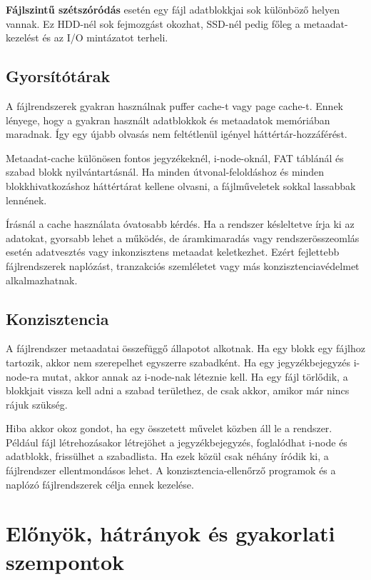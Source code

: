 \textbf{Fájlszintű szétszóródás} esetén egy fájl adatblokkjai sok különböző helyen vannak. Ez HDD-nél sok fejmozgást okozhat, SSD-nél pedig főleg a metaadat-kezelést és az I/O mintázatot terheli.

\subsection{Gyorsítótárak}

A fájlrendszerek gyakran használnak puffer cache-t vagy page cache-t. Ennek lényege, hogy a gyakran használt adatblokkok és metaadatok memóriában maradnak. Így egy újabb olvasás nem feltétlenül igényel háttértár-hozzáférést.

Metaadat-cache különösen fontos jegyzékeknél, i-node-oknál, FAT táblánál és szabad blokk nyilvántartásnál. Ha minden útvonal-feloldáshoz és minden blokkhivatkozáshoz háttértárat kellene olvasni, a fájlműveletek sokkal lassabbak lennének.

Írásnál a cache használata óvatosabb kérdés. Ha a rendszer késleltetve írja ki az adatokat, gyorsabb lehet a működés, de áramkimaradás vagy rendszerösszeomlás esetén adatvesztés vagy inkonzisztens metaadat keletkezhet. Ezért fejlettebb fájlrendszerek naplózást, tranzakciós szemléletet vagy más konzisztenciavédelmet alkalmazhatnak.

\subsection{Konzisztencia}

A fájlrendszer metaadatai összefüggő állapotot alkotnak. Ha egy blokk egy fájlhoz tartozik, akkor nem szerepelhet egyszerre szabadként. Ha egy jegyzékbejegyzés i-node-ra mutat, akkor annak az i-node-nak léteznie kell. Ha egy fájl törlődik, a blokkjait vissza kell adni a szabad területhez, de csak akkor, amikor már nincs rájuk szükség.

Hiba akkor okoz gondot, ha egy összetett művelet közben áll le a rendszer. Például fájl létrehozásakor létrejöhet a jegyzékbejegyzés, foglalódhat i-node és adatblokk, frissülhet a szabadlista. Ha ezek közül csak néhány íródik ki, a fájlrendszer ellentmondásos lehet. A konzisztencia-ellenőrző programok és a naplózó fájlrendszerek célja ennek kezelése.

\section{Előnyök, hátrányok és gyakorlati szempontok}

